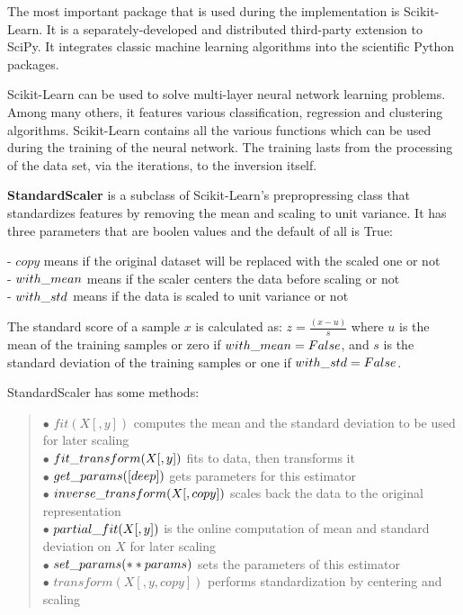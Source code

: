 The most important package that is used during the implementation is Scikit-Learn. It is a separately-developed and distributed third-party extension to SciPy. It integrates classic machine learning algorithms into the scientific Python packages. \smallskip

Scikit-Learn can be used to solve multi-layer neural network learning problems. Among many others, it features various classification, regression and clustering algorithms. Scikit-Learn contains all the various functions which can be used during the training of the neural network. The training lasts from the processing of the data set, via the iterations, to the inversion itself. \bigskip

\textbf{StandardScaler} is a subclass of Scikit-Learn's prepropressing class that standardizes features by removing the mean and scaling to unit variance. It has three parameters that are boolen values and the default of all is True: \smallskip

\noindent - $copy$ means if the original dataset will be replaced with the scaled one or not\\
- $with\char`_mean$ means if the scaler centers the data before scaling or not\\
- $with\char`_std$ means if the data is scaled to unit variance or not \medskip

The standard score of a sample $x$ is calculated as: $z = \frac{(x - u)}{s}$ where $u$ is the mean of the training samples or zero if $with\char`_mean=False$, and $s$ is the standard deviation of the training samples or one if $with\char`_std=False$. \medskip

\noindent StandardScaler has some methods:
\begin{verse}
	$\bullet$ $fit(X[, y])$ computes the mean and the standard deviation to be used for later scaling\\
	$\bullet$ $fit\char`_transform(X[, y])$ fits to data, then transforms it\\
	$\bullet$ $get\char`_params([deep])$ gets parameters for this estimator\\
	$\bullet$ $inverse\char`_transform(X[, copy])$ scales back the data to the original representation\\
	$\bullet$ $partial\char`_fit(X[, y])$ is the online computation of mean and standard deviation on $X$ for later scaling\\
	$\bullet$ $set\char`_params(**params)$ sets the parameters of this estimator\\
	$\bullet$ $transform(X[, y, copy])$ performs standardization by centering and scaling
\end{verse}\smallskip

